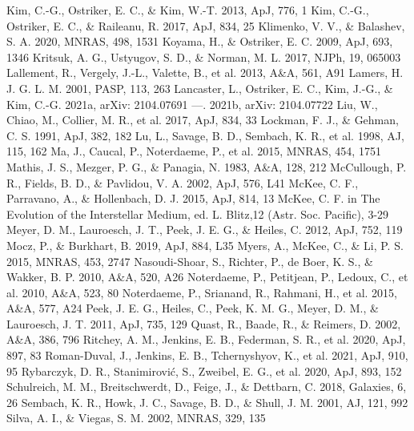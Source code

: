 \documentclass[modern]{aastex63}
\begin{document}
\begin{references}
 Kim, C.-G., Ostriker, E. C., \& Kim, W.-T. 2013, ApJ, 776, 1
 Kim, C.-G., Ostriker, E. C., \& Raileanu, R. 2017, ApJ, 834, 25
 Klimenko, V. V., \& Balashev, S. A. 2020, MNRAS, 498, 1531
 Koyama, H., \& Ostriker, E. C. 2009, ApJ, 693, 1346
 Kritsuk, A. G., Ustyugov, S. D., \& Norman, M. L. 2017, NJPh, 19, 065003
 Lallement, R., Vergely, J.-L., Valette, B., et al. 2013, A\&A, 561, A91
 Lamers, H. J. G. L. M. 2001, PASP, 113, 263
 Lancaster, L., Ostriker, E. C., Kim, J.-G., \& Kim, C.-G. 2021a,  arXiv:  
2104.07691
 ---. 2021b,  arXiv:  2104.07722
 Liu, W., Chiao, M., Collier, M. R., et al. 2017, ApJ, 834, 33
 Lockman, F. J., \& Gehman, C. S. 1991, ApJ, 382, 182
 Lu, L., Savage, B. D., Sembach, K. R., et al. 1998, AJ, 115, 162
 Ma, J., Caucal, P., Noterdaeme, P., et al. 2015, MNRAS, 454, 1751
 Mathis, J. S., Mezger, P. G., \& Panagia, N. 1983, A\&A, 128, 212
 McCullough, P. R., Fields, B. D., \& Pavlidou, V. A. 2002, ApJ, 576, L41
 McKee, C. F., Parravano, A., \& Hollenbach, D. J. 2015, ApJ, 814, 13
 McKee, C. F. in The Evolution of the Interstellar Medium, ed. L. Blitz,12 (Astr. 
Soc. Pacific), 3-29
 Meyer, D. M., Lauroesch, J. T., Peek, J. E. G., \& Heiles, C. 2012, ApJ, 752, 119
 Mocz, P., \& Burkhart, B. 2019, ApJ, 884, L35
 Myers, A., McKee, C., \& Li, P. S. 2015, MNRAS, 453, 2747
 Nasoudi-Shoar, S., Richter, P., de Boer, K. S., \& Wakker, B. P. 2010, A\&A, 
520, A26
 Noterdaeme, P., Petitjean, P., Ledoux, C., et al. 2010, A\&A, 523, 80
 Noterdaeme, P., Srianand, R., Rahmani, H., et al. 2015, A\&A, 577, A24
 Peek, J. E. G., Heiles, C., Peek, K. M. G., Meyer, D. M., \& Lauroesch, J. T. 
2011, ApJ, 735, 129
 Quast, R., Baade, R., \& Reimers, D. 2002, A\&A, 386, 796
 Ritchey, A. M., Jenkins, E. B., Federman, S. R., et al. 2020, ApJ, 897, 83
 Roman-Duval, J., Jenkins, E. B., Tchernyshyov, K., et al. 2021, ApJ, 910, 95
 Rybarczyk, D. R., Stanimirović, S., Zweibel, E. G., et al. 2020, ApJ, 893, 152
 Schulreich, M. M., Breitschwerdt, D., Feige, J., \& Dettbarn, C. 2018, Galaxies, 
6, 26
 Sembach, K. R., Howk, J. C., Savage, B. D., \& Shull, J. M. 2001, AJ, 121, 992
 Silva, A. I., \& Viegas, S. M. 2002, MNRAS, 329, 135

\end{references}
\end{document}
